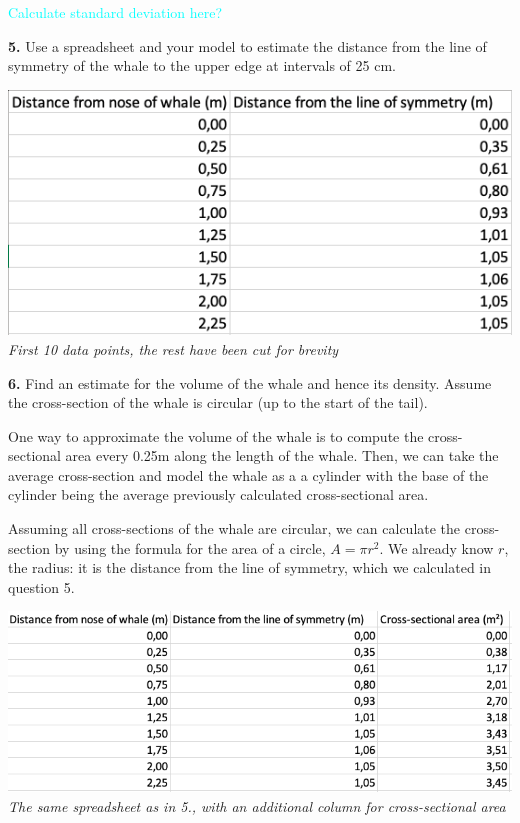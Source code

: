 \documentclass[fleqn]{article}
\newcommand\ask[1]{\textcolor{cyan}{#1}}
\begin{document}
\ask{Calculate standard deviation here?}
  
\textbf{5.}	Use a spreadsheet and your model to estimate the distance from the line of symmetry of the whale to the upper edge at intervals of 25 cm.

\includegraphics[scale=0.4]{spreadsheet_no_cross.png} \\
\textit{\small First 10 data points, the rest have been cut for brevity}

\textbf{6.}	Find an estimate for the volume of the whale and hence its density. Assume the cross-section of the whale is circular (up to the start of the tail).

One way to approximate the volume of the whale is to compute the cross-sectional area every 0.25m along the length of the whale. Then, we can take the average cross-section and model the whale as a a cylinder with the base of the cylinder being the average previously calculated cross-sectional area.

Assuming all cross-sections of the whale are circular, we can calculate the cross-section by using the formula for the area of a circle, $A=\pi r^2$. We already know $r$, the radius: it is the distance from the line of symmetry, which we calculated in question 5.

\includegraphics[scale=0.4]{spreadsheet_with_cross.png} \\
\textit{\small The same spreadsheet as in 5., with an additional column for cross-sectional area}
\end{document}

